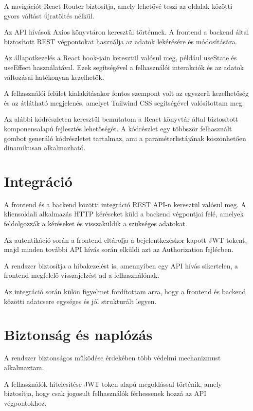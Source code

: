 \documentclass[
]{thesis-ekf}
\theoremstyle{definition}
\theoremstyle{remark}
\begin{document}
A navigációt React Router biztosítja, amely lehetővé teszi az oldalak közötti gyors váltást újratöltés nélkül.

Az API hívások Axios könyvtáron keresztül történnek. A frontend a backend által biztosított REST végpontokat használja az adatok lekérésére és módosítására.

Az állapotkezelés a React hook-jain keresztül valósul meg, például useState és useEffect használatával. Ezek segítségével a felhasználói interakciók és az adatok változásai hatékonyan kezelhetők.

A felhasználói felület kialakításakor fontos szempont volt az egyszerű kezelhetőség és az átlátható megjelenés, amelyet Tailwind CSS segítségével valósítottam meg.

Az alábbi kódrészleten keresztül bemutatom a React könyvtár által biztosított komponensalapú fejlesztés lehetőségét.
A kódrészlet egy többször felhasznált gombot generáló kódrészletet tartalmaz, ami a paraméterlistájának köszönhetően dinamikusan alkalmazható.



\section{Integráció}
A frontend és a backend közötti integráció REST API-n keresztül valósul meg. A kliensoldali alkalmazás HTTP kéréseket küld a backend végpontjai felé, amelyek feldolgozzák a kéréseket és visszaküldik a szükséges adatokat.

Az autentikáció során a frontend eltárolja a bejelentkezéskor kapott JWT tokent, majd minden további API hívás során elküldi azt az Authorization fejlécben.

A rendszer biztosítja a hibakezelést is, amennyiben egy API hívás sikertelen, a frontend megfelelő visszajelzést ad a felhasználónak.

Az integráció során külön figyelmet fordítottam arra, hogy a frontend és backend közötti adatcsere egységes és jól strukturált legyen.

\section{Biztonság és naplózás}
A rendszer biztonságos működése érdekében több védelmi mechanizmust alkalmaztam.

A felhasználók hitelesítése JWT token alapú megoldással történik, amely biztosítja, hogy csak jogosult felhasználók férhessenek hozzá az API végpontokhoz.
\end{document}
